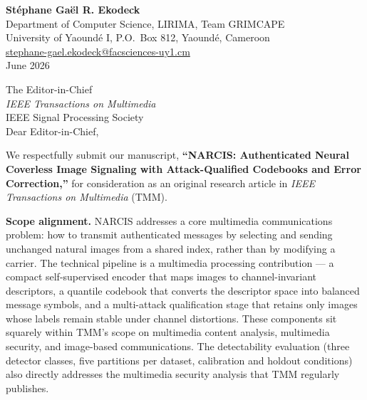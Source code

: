 \documentclass[10pt,letterpaper]{article}
\newcommand{\clhead}[1]{\textcolor{ieeeblue}{\textbf{#1}}}
\begin{document}
\begin{flushright}
\textbf{St\'ephane Ga\"el R. Ekodeck}\\
Department of Computer Science, LIRIMA, Team GRIMCAPE\\
University of Yaound\'e I, P.O.\ Box 812, Yaound\'e, Cameroon\\
\href{mailto:stephane-gael.ekodeck@facsciences-uy1.cm}%
{stephane-gael.ekodeck@facsciences-uy1.cm}\\
June 2026
\end{flushright}

The Editor-in-Chief\\
\textit{IEEE Transactions on Multimedia}\\
IEEE Signal Processing Society\\

Dear Editor-in-Chief,

We respectfully submit our manuscript, \textbf{``NARCIS: Authenticated
Neural Coverless Image Signaling with Attack-Qualified Codebooks and
Error Correction,''} for consideration as an original research article in
\textit{IEEE Transactions on Multimedia} (TMM).

\clhead{Scope alignment.}
NARCIS addresses a core multimedia communications problem: how to
transmit authenticated messages by selecting and sending unchanged
natural images from a shared index, rather than by modifying a carrier.
The technical pipeline is a multimedia processing contribution ---
a compact self-supervised encoder that maps images to channel-invariant
descriptors, a quantile codebook that converts the descriptor space into
balanced message symbols, and a multi-attack qualification stage that
retains only images whose labels remain stable under channel
distortions. These components sit squarely within TMM's scope on
multimedia content analysis, multimedia security, and image-based
communications. The detectability evaluation (three detector classes,
five partitions per dataset, calibration and holdout conditions) also
directly addresses the multimedia security analysis that TMM regularly
publishes.
\end{document}
